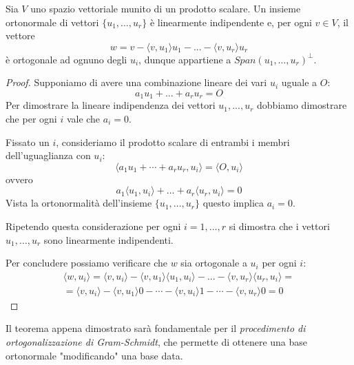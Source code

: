 \begin{theorem}\label{orto}
	Sia $V$ uno spazio vettoriale munito di un prodotto scalare. Un insieme
	ortonormale di vettori $\{u_1, \dots, u_r\}$ \`e linearmente indipendente
	e, per ogni $v \in V$, il vettore
	\begin{equation*}
		w = v - \langle v, u_1 \rangle u_1 - ... -\langle v, u_r \rangle u_r
	\end{equation*}
	\`e ortogonale ad ognuno degli $u_i$, dunque appartiene a
	$Span(u_1, \dots, u_r)^{\perp}$.
	\begin{proof}
		Supponiamo di avere una combinazione lineare dei vari $u_i$ uguale a $O$:
		\[
			a_1 u_1 + ... + a_r u_r = O
		\]
		Per dimostrare la lineare indipendenza dei vettori $u_1, ..., u_r$ dobbiamo
		dimostrare che per ogni $i$ vale che $a_i = 0$.

		Fissato un $i$, consideriamo il prodotto scalare di entrambi i membri
		dell'uguaglianza con $u_i$:
		\[
			\langle a_1 u_1 + \cdots + a_r u_r, u_i \rangle = \langle O, u_i \rangle
		\]
		ovvero
		\[
			a_1 \langle u_1, u_i \rangle + \dots + a_r \langle u_r, u_i \rangle = 0
		\]
		Vista la ortonormalit\`a dell'insieme $\{ u_1, \dots, u_r \}$ questo implica
		$a_i = 0$.

		Ripetendo questa considerazione per ogni $i = 1, \dots, r$ si dimostra che i vettori
		$u_1, \dots, u_r$ sono linearmente indipendenti.

		Per concludere possiamo verificare che $w$ sia ortogonale a $u_i$ per ogni $i$:
		\begin{gather*}
			\langle w, u_i \rangle = \langle v, u_i \rangle - \langle v, u_1 \rangle
			\langle u_1, u_i \rangle - ... - \langle v, u_r \rangle \langle u_r, u_i \rangle =\\
			= \langle v, u_i \rangle - \langle v, u_1 \rangle 0 - \cdots - \langle v, u_i \rangle 1
			- \cdots - \langle v, u_r \rangle 0 = 0
		\end{gather*}
	\end{proof}
\end{theorem}

Il teorema appena dimostrato sar\`a fondamentale per il
\emph{procedimento di ortogonalizzazione di Gram-Schmidt}, che permette di ottenere una base
ortonormale "modificando" una base data.

